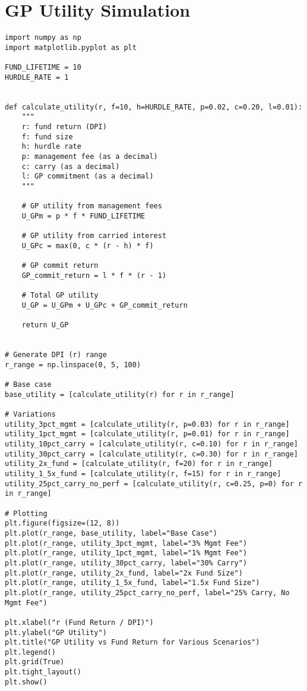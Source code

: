 \documentclass[a4paper, oneside]{discothesis}
\begin{document}



\appendix
\chapter{GP Utility Simulation}

\begin{verbatim}
import numpy as np
import matplotlib.pyplot as plt

FUND_LIFETIME = 10
HURDLE_RATE = 1


def calculate_utility(r, f=10, h=HURDLE_RATE, p=0.02, c=0.20, l=0.01):
    """
    r: fund return (DPI)
    f: fund size
    h: hurdle rate
    p: management fee (as a decimal)
    c: carry (as a decimal)
    l: GP commitment (as a decimal)
    """

    # GP utility from management fees
    U_GPm = p * f * FUND_LIFETIME

    # GP utility from carried interest
    U_GPc = max(0, c * (r - h) * f)

    # GP commit return
    GP_commit_return = l * f * (r - 1)

    # Total GP utility
    U_GP = U_GPm + U_GPc + GP_commit_return

    return U_GP


# Generate DPI (r) range
r_range = np.linspace(0, 5, 100)

# Base case
base_utility = [calculate_utility(r) for r in r_range]

# Variations
utility_3pct_mgmt = [calculate_utility(r, p=0.03) for r in r_range]
utility_1pct_mgmt = [calculate_utility(r, p=0.01) for r in r_range]
utility_10pct_carry = [calculate_utility(r, c=0.10) for r in r_range]
utility_30pct_carry = [calculate_utility(r, c=0.30) for r in r_range]
utility_2x_fund = [calculate_utility(r, f=20) for r in r_range]
utility_1_5x_fund = [calculate_utility(r, f=15) for r in r_range]
utility_25pct_carry_no_perf = [calculate_utility(r, c=0.25, p=0) for r in r_range]

# Plotting
plt.figure(figsize=(12, 8))
plt.plot(r_range, base_utility, label="Base Case")
plt.plot(r_range, utility_3pct_mgmt, label="3% Mgmt Fee")
plt.plot(r_range, utility_1pct_mgmt, label="1% Mgmt Fee")
plt.plot(r_range, utility_30pct_carry, label="30% Carry")
plt.plot(r_range, utility_2x_fund, label="2x Fund Size")
plt.plot(r_range, utility_1_5x_fund, label="1.5x Fund Size")
plt.plot(r_range, utility_25pct_carry_no_perf, label="25% Carry, No Mgmt Fee")

plt.xlabel("r (Fund Return / DPI)")
plt.ylabel("GP Utility")
plt.title("GP Utility vs Fund Return for Various Scenarios")
plt.legend()
plt.grid(True)
plt.tight_layout()
plt.show()
    
\end{verbatim}
\end{document}
